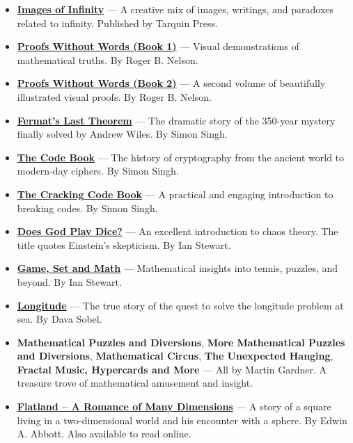 \documentclass[11pt]{article}
\begin{document}
\begin{itemize}
\item \href{https://isbn.is/0906212898}{\textbf{Images of Infinity}} — A creative mix of images, writings, and paradoxes related to infinity. Published by Tarquin Press.

\item \href{https://isbn.is/0883857006}{\textbf{Proofs Without Words (Book 1)}} — Visual demonstrations of mathematical truths. By Roger B. Nelson.

\item \href{https://isbn.is/0883857219}{\textbf{Proofs Without Words (Book 2)}} — A second volume of beautifully illustrated visual proofs. By Roger B. Nelson.

\item \href{https://isbn.is/1841157910}{\textbf{Fermat’s Last Theorem}} — The dramatic story of the 350-year mystery finally solved by Andrew Wiles. By Simon Singh.

\item \href{https://isbn.is/1857028899}{\textbf{The Code Book}} — The history of cryptography from the ancient world to modern-day ciphers. By Simon Singh.

\item \href{https://isbn.is/000717604X}{\textbf{The Cracking Code Book}} — A practical and engaging introduction to breaking codes. By Simon Singh.

\item \href{https://isbn.is/0140256024}{\textbf{Does God Play Dice?}} — An excellent introduction to chaos theory. The title quotes Einstein’s skepticism. By Ian Stewart.

\item \href{https://isbn.is/0140132376}{\textbf{Game, Set and Math}} — Mathematical insights into tennis, puzzles, and beyond. By Ian Stewart.

\item \href{https://isbn.is/0007214227}{\textbf{Longitude}} — The true story of the quest to solve the longitude problem at sea. By Dava Sobel.

\item \textbf{Mathematical Puzzles and Diversions}, \textbf{More Mathematical Puzzles and Diversions}, \textbf{Mathematical Circus}, \textbf{The Unexpected Hanging}, \textbf{Fractal Music, Hypercards and More} — All by Martin Gardner. A treasure trove of mathematical amusement and insight.

\item \href{http://www.geom.uiuc.edu/~banchoff/Flatland/}{\textbf{Flatland – A Romance of Many Dimensions}} — A story of a square living in a two-dimensional world and his encounter with a sphere. By Edwin A. Abbott. Also available to read online.

\end{itemize}
\end{document}

